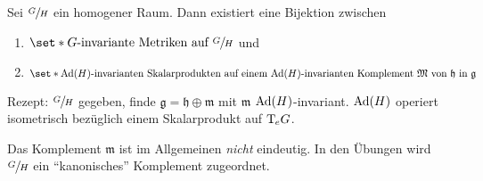 \begin{korollarB}
	Sei $\sfrac{G}{H}$ ein homogener Raum.
	Dann existiert eine Bijektion zwischen
	\begin{enumerate}[1)]
		\item $\set*{\text{$G$-invariante Metriken auf $\sfrac{G}{H}$}}$ und
		\item $\set*{\text{$\Ad(H)$-invarianten Skalarprodukten auf einem $\Ad(H)$-invarianten Komplement $\mathfrak{M}$ von $\mathfrak{h}$ in $\mathfrak{g}$} }$
	\end{enumerate}
\end{korollarB}

Rezept: $\sfrac{G}{H}$ gegeben, finde $\mathfrak{g} = \mathfrak{h} \oplus \mathfrak{m}$ mit $\mathfrak{m}$ $\operatorname{Ad}(H)$-invariant.
$\operatorname{Ad}(H)$ operiert isometrisch bezüglich einem Skalarprodukt auf $\mathrm{T}\mkern-0.85mu_e G$.

\begin{bemerkung*}
	Das Komplement $\mathfrak{m}$ ist im Allgemeinen \emph{nicht} eindeutig.
	In den Übungen wird $\sfrac{G}{H}$ ein \enquote{kanonisches} Komplement zugeordnet.
\end{bemerkung*}


